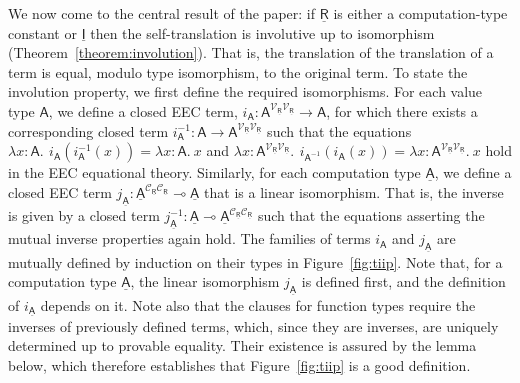 \documentclass{LMCS}
\newcommand{\comptype}[1]{\underline{#1}}
\newcommand{\VA}{\mathsf{A}}
\newcommand{\CA}{\comptype{\mathsf{A}}}
\newcommand{\CR}{\comptype{\mathsf{R}}}
\newcommand{\CI}{\comptype{\mathsf{I}}}
\newcommand{\Vfun}{\to}
\newcommand{\lpop}{\multimap}
\newcommand{\In}[2]{#1 \colon  \! #2}
\newcommand{\Vlam}[3]{\lambda \In{#1}{#2}.\: #3}
\newcommand{\Vappl}[2]{#1(#2)}
\newcommand{\CpsVVT}[1]{#1^{\mathcal{V}_{\CR}\mathcal{V}_{\CR}}}
\newcommand{\CpsCCT}[1]{#1^{\mathcal{C}_{\CR}\mathcal{C}_{\CR}}}
\newcommand{\Viso}[1]{i_{#1}}
\newcommand{\Ciso}[1]{j_{#1}}
\begin{document}
We now come to the central result of the paper:
if $\CR$ is either a computation-type constant or $\CI$ then 
the self-translation is involutive up to isomorphism (Theorem~\ref{theorem:involution}).
That is, the translation of the translation of a term is equal,
modulo type isomorphism, to the original term.
To state the involution property, we first define the required isomorphisms.
For each value type $\VA$, we define a closed EEC term, $\Viso{\VA} \colon \CpsVVT{\VA} \Vfun \VA$,
for which there exists a corresponding closed
term 
$\Viso{\VA}^{-1} \colon \VA \Vfun \CpsVVT{\VA}$ 
such that the equations
$\Vlam{x}{\VA}{\,\Vappl{\Viso{\VA}}{\Vappl{\Viso{\VA}^{-1}}{x}}} = \Vlam{x}{\VA}{x}$ and
$\Vlam{x}{\CpsVVT{\VA}}{\,\Vappl{\Viso{{\VA}^{-1}}}{\Vappl{\Viso{\VA}}{x}}} = \Vlam{x}{\CpsVVT{\VA}}{x}$
hold in the EEC equational theory.
Similarly, for each computation type $\CA$, we define a closed EEC term 
$\Ciso{\CA} \colon \CpsCCT{\CA} \lpop \CA$ that is a linear isomorphism. That is,
the inverse is given by a closed term $\Ciso{\CA}^{-1} \colon \CA \lpop \CpsCCT{\CA}$
such that the equations asserting the mutual inverse properties again hold.
The families of terms $\Viso{\VA}$ and $\Ciso{\CA}$ are mutually defined by induction on 
their types in Figure~\ref{fig:tiip}. Note that, for a computation type $\CA$, the
linear isomorphism $\Ciso{\CA}$ is defined first, and the definition of $\Viso{\CA}$ 
depends on it.
Note also that the clauses for function types require the inverses
of previously defined terms, which, since they are inverses, are 
uniquely determined up to provable equality. Their existence 
is assured by
the lemma below, which therefore establishes
that Figure~\ref{fig:tiip} is a good definition.
\end{document}
